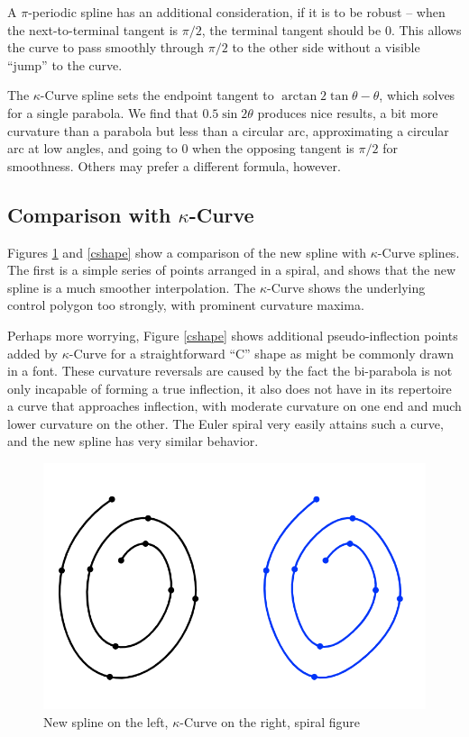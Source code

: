 \documentclass{article}
\newcommand{\kcurve}{$\kappa$-Curve}
\begin{document}
A $\pi$-periodic spline has an additional consideration, if it is to be robust -- when the next-to-terminal tangent is $\pi/2$, the terminal tangent should be $0$. This allows the curve to pass smoothly through $\pi/2$ to the other side without a visible ``jump'' to the curve.

The \kcurve{} spline sets the endpoint tangent to $\arctan{2\tan \theta} - \theta$, which solves for a single parabola. We find that $0.5\sin 2\theta$ produces nice results, a bit more curvature than a parabola but less than a circular arc, approximating a circular arc at low angles, and going to $0$ when the opposing tangent is $\pi/2$ for smoothness. Others may prefer a different formula, however.

\subsection{Comparison with \kcurve{}}

Figures \ref{spiral} and \ref{cshape} show a comparison of the new spline with \kcurve{} splines. The first is a simple series of points arranged in a spiral, and shows that the new spline is a much smoother interpolation. The \kcurve{} shows the underlying control polygon too strongly, with prominent curvature maxima.

Perhaps more worrying, Figure \ref{cshape} shows additional pseudo-inflection points added by \kcurve{} for a straightforward ``C'' shape as might be commonly drawn in a font. These curvature reversals are caused by the fact the bi-parabola is not only incapable of forming a true inflection, it also does not have in its repertoire a curve that approaches inflection, with moderate curvature on one end and much lower curvature on the other. The Euler spiral very easily attains such a curve, and the new spline has very similar behavior.

\begin{figure}
\centering
\includegraphics[scale=0.5]{biparab_mine_spiral}
\caption{New spline on the left{}, \kcurve{} on the right, spiral figure}
\label{spiral}
\end{figure}
\end{document}
